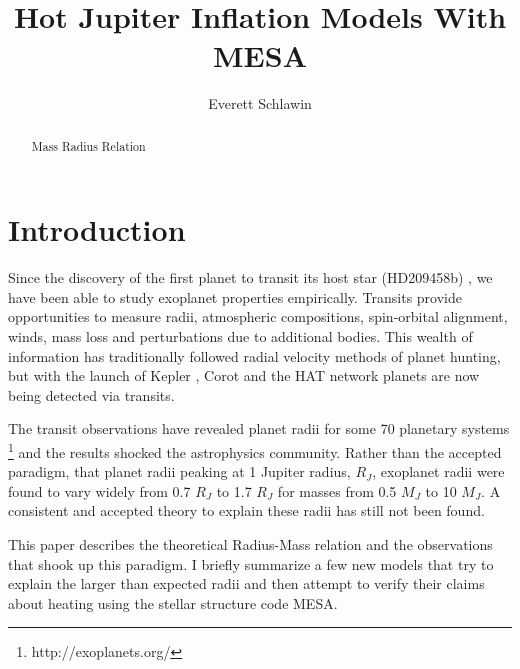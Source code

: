 \documentclass[twocolumn]{emulateapj}
\begin{document}
\title{Hot Jupiter Inflation Models With MESA}
\author{Everett Schlawin}

\begin{abstract}
Mass Radius Relation
\end{abstract}
\maketitle
\section{Introduction}

Since the discovery of the first planet to transit its host star (HD209458b) \citep{charb,henry2000}, we have been able to study exoplanet properties empirically. Transits provide opportunities to measure radii, atmospheric compositions, spin-orbital alignment, winds, mass loss and perturbations due to additional bodies. This wealth of information has traditionally followed radial velocity methods of planet hunting, but with the launch of Kepler \citep{borucki}, Corot and the HAT network \citep{bakos} planets are now being detected via transits.

The transit observations have revealed planet radii for some 70 planetary systems \footnote{http://exoplanets.org/} and the results shocked the astrophysics community. Rather than the accepted paradigm, that planet radii peaking at 1 Jupiter radius, $R_J$, exoplanet radii were found to vary widely from 0.7 $R_J$ to 1.7 $R_J$ for masses from 0.5 $M_J$ to 10 $M_J$. A consistent and accepted theory to explain these radii has still not been found.

This paper describes the theoretical Radius-Mass relation and the observations that shook up this paradigm. I briefly summarize a few new models that try to explain the larger than expected radii and then attempt to verify their claims about heating using the stellar structure code MESA.
\end{document}
